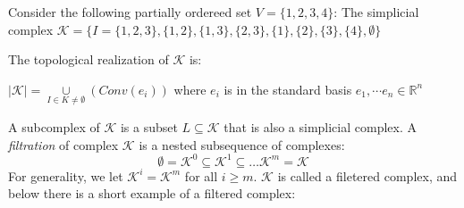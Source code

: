 \documentclass[11pt,a4paper]{report}
\begin{document}
            
            \begin{Ex}
              Consider the following partially ordereed set  $ V = \{1, 2, 3, 4\}$: 
              The simplicial complex 
              $\mathcal{K} = \{I = \{1, 2, 3\}, \{1, 2\}, \{1, 3\}, \{2, 3\}, \{1\}, \{2\}, \{3\}, \{4\}, \emptyset\}$
             
             \begin{center}
              

             
             \end{center}
             The topological realization of $\mathcal{K}$ is: 
             
              $|\mathcal{K}| = \underset{I\in K \ne \emptyset}{\cup} (Conv(e_i))$ where $e_i$ is in the standard basis $e_1, \cdots e_n \in \mathbb{R}^n$ 
            \end{Ex}
            
            A subcomplex of $\mathcal{K}$ is a subset $L \subseteq \mathcal{K}$ that is also a simplicial complex.
            \label{complexfiltration}
            A \emph{filtration} of complex $\mathcal{K}$ is a nested subsequence of complexes: 
             \[
              \emptyset = \mathcal{K}^0 \subseteq \mathcal{K}^1 \subseteq \dots \mathcal{K}^m = \mathcal{K}  
             \]
             For generality, we let $\mathcal{K}^i = \mathcal{K}^m$ for all $i \geq m$. $\mathcal{K}$ is called a filetered complex, and below there is a short example of a filtered complex: 
             
\end{document}
